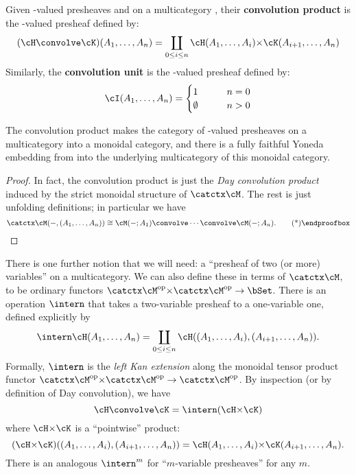 \begin{defn}\label{defn:multicat-convolve}
  Given \bSet-valued presheaves \cH and \cK on a multicategory \cM, their \textbf{convolution product} is the \bSet-valued presheaf defined by:
  \[ (\cH\convolve\cK)(A_1,\dots,A_n) = \coprod_{0\le i\le n} \cH(A_1,\dots,A_i) \times \cK(A_{i+1},\dots,A_n) \]
  Similarly, the \textbf{convolution unit} is the \bSet-valued presheaf defined by:
  \[ \cI(A_1,\dots,A_n) =
  \begin{cases}
    1 &\qquad n=0\\
    \emptyset & \qquad n>0
  \end{cases}\]
\end{defn}

\begin{lem}\label{thm:multicat-yonemb}
  The convolution product makes the category of \bSet-valued presheaves on a multicategory \cM into a monoidal category, and there is a fully faithful Yoneda embedding from \cM into the underlying multicategory of this monoidal category.
\end{lem}
\begin{proof}
  In fact, the convolution product is just the \emph{Day convolution product}~\cite{day:closed} induced by the strict monoidal structure of $\catctx\cM$.
  The rest is just unfolding definitions; in particular we have
  \[ \catctx\cM(-,(A_1,\dots,A_n)) \cong \cM(-;A_1)\convolve \cdots \convolve \cM(-;A_n).\qedhere \]
\end{proof}

There is one further notion that we will need: a ``presheaf of two (or more) variables'' on a multicategory.
We can also define these in terms of $\catctx\cM$, to be ordinary functors $\catctx\cM\op \times \catctx\cM\op \to \bSet$.
There is an operation $\intern$ that takes a two-variable presheaf to a one-variable one, defined explicitly by
\[ \intern\cH(A_1,\dots,A_n) = \coprod_{0\le i\le n} \cH((A_1,\dots,A_i),(A_{i+1},\dots,A_n)). \]
Formally, $\intern$ is the \emph{left Kan extension} along the monoidal tensor product functor $\catctx\cM\op \times \catctx\cM\op \to  \catctx\cM\op$.
By inspection (or by definition of Day convolution), we have
\[ \cH\convolve \cK = \intern(\cH\times\cK) \]
where $\cH\times\cK$ is a ``pointwise'' product:
\[ (\cH\times\cK)((A_1,\dots,A_i),(A_{i+1},\dots,A_n)) = \cH(A_1,\dots,A_i) \times \cK(A_{i+1},\dots,A_n). \]
There is an analogous $\intern^m$ for ``$m$-variable presheaves'' for any $m$.

